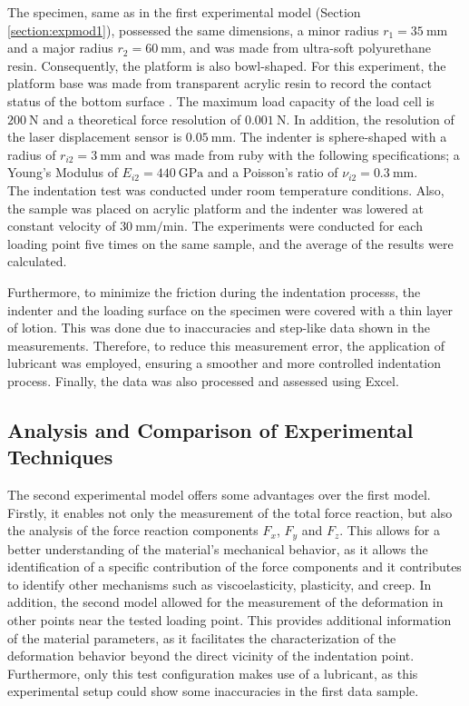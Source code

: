 The specimen, same as in the first experimental model (Section \ref{section:expmod1}),
 possessed the same dimensions, a minor radius $r_1 = \SI{35}{\milli \m}$ and a major 
 radius $r_2 = \SI{60}{\milli \m}$, and was
made from ultra-soft polyurethane resin. Consequently, the platform is also 
bowl-shaped. For this experiment, the platform base was made from transparent 
acrylic resin to record the contact status of the bottom surface \cite{Mori2022}. 
The maximum load capacity of the load cell is $\SI{200}{\newton}$ and a theoretical 
force resolution of $\SI{0.001}{\newton}$. In addition, the resolution of the 
laser displacement sensor is $\SI{0.05}{\milli \m}$.
The indenter is sphere-shaped with a radius of $r_{i2} = \SI{3}{\milli \m}$ and
was made from ruby with the following specifications; 
a Young's Modulus of $E_{i2} = \SI{440}{\giga \pascal}$ and a Poisson's ratio of 
$\nu_{i2} = \SI{0.3}{\milli \m}$.\\

The indentation test was conducted under room temperature conditions. Also, 
the sample was placed on acrylic platform and the indenter was 
lowered at constant velocity of $\SI[per-mode = symbol]{30}{\milli \m\per \minute}$. 
The experiments were conducted for each loading point five times on the same sample, 
and the average of the results were calculated.

Furthermore, to minimize the friction during the indentation processs, the indenter 
and the loading surface on the specimen were covered with a thin layer of lotion. 
This was done due to inaccuracies and step-like data shown in the measurements. Therefore, to reduce 
this measurement error, the application of lubricant was employed, ensuring a 
smoother and more controlled indentation process. Finally, the data 
was also processed and assessed using Excel.

\subsection*{Analysis and Comparison of Experimental Techniques}

The second experimental model offers some advantages over the first model. 
Firstly, it enables not only the measurement of the total force reaction, but also the analysis 
of the force reaction components $F_x$, $F_y$ and $F_z$. This allows for a better 
understanding of the material's mechanical behavior, as it allows the identification 
of a specific contribution of the force components and it contributes to identify other 
mechanisms such as viscoelasticity, plasticity, and creep. 
In addition, the second model allowed for the measurement of the deformation in other 
points near the tested loading point. This provides additional information of the 
material parameters, as it facilitates the characterization of the deformation behavior beyond the 
direct vicinity of the indentation point. Furthermore, only this test configuration makes 
use of a lubricant, as this experimental setup could show some inaccuracies in the first data sample.

